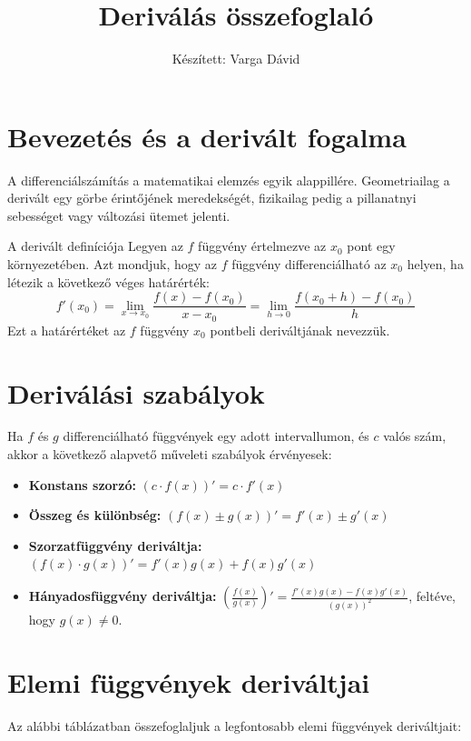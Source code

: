 \documentclass[11pt,a4paper]{article}
\title{Deriválás összefoglaló}
\author{Készített: Varga Dávid}
\date{}
\begin{document}
\maketitle

\section{Bevezetés és a derivált fogalma}
A differenciálszámítás a matematikai elemzés egyik alappillére. Geometriailag a derivált egy görbe érintőjének meredekségét, fizikailag pedig a pillanatnyi sebességet vagy változási ütemet jelenti.

\begin{defbox}{A derivált definíciója}
Legyen az $f$ függvény értelmezve az $x_0$ pont egy környezetében. Azt mondjuk, hogy az $f$ függvény differenciálható az $x_0$ helyen, ha létezik a következő véges határérték:
\[
f'(x_0) = \lim_{x \to x_0} \frac{f(x) - f(x_0)}{x - x_0} = \lim_{h \to 0} \frac{f(x_0 + h) - f(x_0)}{h}
\]
Ezt a határértéket az $f$ függvény $x_0$ pontbeli deriváltjának nevezzük.
\end{defbox}

\section{Deriválási szabályok}
Ha $f$ és $g$ differenciálható függvények egy adott intervallumon, és $c$ valós szám, akkor a következő alapvető műveleti szabályok érvényesek:

\begin{itemize}
    \item \textbf{Konstans szorzó:} $(c \cdot f(x))' = c \cdot f'(x)$
    \item \textbf{Összeg és különbség:} $(f(x) \pm g(x))' = f'(x) \pm g'(x)$
    \item \textbf{Szorzatfüggvény deriváltja:} $(f(x) \cdot g(x))' = f'(x)g(x) + f(x)g'(x)$
    \item \textbf{Hányadosfüggvény deriváltja:} $\left(\frac{f(x)}{g(x)}\right)' = \frac{f'(x)g(x) - f(x)g'(x)}{(g(x))^2}$, feltéve, hogy $g(x) \neq 0$.
\end{itemize}

\section{Elemi függvények deriváltjai}
Az alábbi táblázatban összefoglaljuk a legfontosabb elemi függvények deriváltjait:
\end{document}
